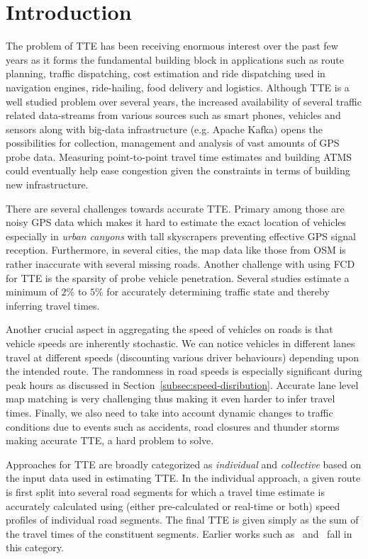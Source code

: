 \section{Introduction}
\label{sec:intro}
The problem of \ac{TTE} has been receiving enormous interest over the past few years as it forms the fundamental building block in  applications such as route planning, traffic dispatching, cost estimation and ride dispatching used in navigation engines, ride-hailing, food delivery and logistics. Although \ac{TTE} is a well studied problem over several years, the increased availability of several traffic related data-streams from various sources such as smart phones, vehicles and sensors along with big-data infrastructure (e.g. Apache Kafka) opens the possibilities for collection, management and analysis of vast amounts of GPS probe data. Measuring point-to-point travel time estimates and building \ac{ATMS} could eventually help ease congestion given the constraints in terms of building new infrastructure.



There are several challenges towards accurate \ac{TTE}. Primary among those are noisy GPS data which makes it hard to estimate the exact location of vehicles especially in {\it urban canyons} with tall skyscrapers preventing effective GPS signal reception. Furthermore, in several cities, the map data like those from \ac{OSM} is rather inaccurate with several missing roads. Another challenge with using \ac{FCD} for \ac{TTE} is the sparsity of probe vehicle penetration. Several studies estimate a minimum of $2\%$ to $5\%$ for accurately determining traffic state and thereby inferring travel times.

Another crucial aspect in aggregating the speed of vehicles on roads is that vehicle speeds are inherently stochastic. We can notice vehicles in different lanes travel at different speeds (discounting various driver behaviours) depending upon the intended route. The randomness in road speeds is especially significant during peak hours as discussed in Section~\ref{subsec:speed-disribution}. Accurate lane level map matching is very challenging thus making it even harder to infer travel times. Finally, we also need to take into account dynamic changes to traffic conditions due to events such as accidents, road closures and thunder storms making accurate \ac{TTE}, a hard problem to solve. 

Approaches for TTE are broadly categorized as \emph{individual} and \emph{collective} based on the input data used in estimating TTE. In the individual approach, a given route is first split into several road  segments for which a travel time estimate is accurately calculated using (either pre-calculated or real-time or both) speed profiles of individual road segments. The final TTE is given simply as the sum of the travel times of the constituent segments. Earlier works such as~\cite{de2008traffic} and~\cite{nanthawichit2003application} fall in this category.
%

